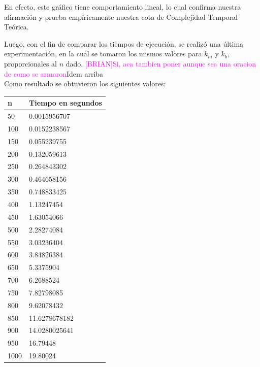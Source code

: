   En efecto, este gr\'afico tiene comportamiento lineal, lo cual confirma nuestra afirmaci\'on y prueba emp\'iricamente nuestra cota de Complejidad Temporal Te\'orica.
  
  \newpage
  
  Luego, con el fin de comparar los tiempos de ejecuci\'on, se realiz\'o una \'ultima experimentaci\'on, en la cual se tomaron los mismos valores para $k_m$ y $k_b$, proporcionales al $n$ dado.
  \textcolor{magenta}{[BRIAN]Si, aca tambien poner aunque sea una oracion de como se armaron}\textcolor{azul}{Idem arriba}\\
  
  
  Como resultado se obtuvieron los siguientes valores:
    \begin{table}[htb]
  \centering
  \begin{tabular}[c]{|l|l|}

		\hline
n & Tiempo en segundos\\
		\hline
50	&	0.0015956707\\
		\hline
100	&	0.0152238567\\
		\hline
150	&	0.055239755\\
		\hline
200	&	0.132059613\\
		\hline
250	&	0.264843302\\
		\hline
300	&	0.464658156\\
		\hline
350	&	0.748833425\\
		\hline
400	&	1.13247454\\
		\hline
450	&	1.63054066\\
		\hline
500	&	2.28274084\\
		\hline
550	&	3.03236404\\
		\hline
600	&	3.84826384\\
		\hline
650	&	5.3375904\\
		\hline
700	&	6.2688524\\
		\hline
750	&	7.82798085\\
		\hline
800	&	9.62078432\\
		\hline
850	&	11.6278678182\\
		\hline
900	&	14.0280025641\\
		\hline
950	&	16.79448\\
		\hline
1000	&	19.80024\\
		\hline

	\end{tabular}
	\end{table}
	
